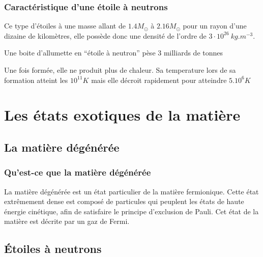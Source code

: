 \documentclass[11pt]{book} %
\begin{document}
\subsection{Caractéristique d'une étoile à neutrons}\label{neutron}
Ce type d'étoiles à une masse allant de \(1.4M_\odot\) à \(2.16M_\odot\) pour un rayon d'une dizaine de kilomètres, elle possède donc une densité de l'ordre de \(3\cdot 10^{26}\ kg.m^{-3}\).
\begin{remark}
    Une boite d'allumette en ``étoile à neutron'' pèse 3 milliards de tonnes
\end{remark}
Une fois formée, elle ne produit plus de chaleur. Sa temperature lors de sa formation atteint les \(10^{11}K\) mais elle décroit rapidement pour atteindre \(5.10^6K\)

\chapter{Les états exotiques de la matière}

\section{La matière dégénérée}
\subsection{Qu'est-ce que la matière dégénérée}
La matière dégénérée est un état particulier de la matière fermionique. Cette état extrêmement dense est composé de particules qui peuplent les états de haute énergie cinétique, afin de satisfaire le principe d'exclusion de Pauli. Cet état de la matière est décrite par un gaz de Fermi.


\section{Étoiles à neutrons}
\end{document}
